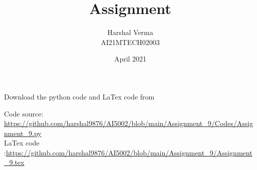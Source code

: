 \documentclass[journal,12pt,twocolumn]{IEEEtran}
\DeclareMathOperator*{\Res}{Res}
\begin{document}
\newcommand{\BEQA}{\begin{eqnarray}}
\newcommand{\EEQA}{\end{eqnarray}}
\newcommand{\define}{\stackrel{\triangle}{=}}

\raggedbottom
\setlength{\parindent}{0pt}
\providecommand{\mbf}{\mathbf}
\providecommand{\pr}[1]{\ensuremath{\Pr\left(#1\right)}}
\providecommand{\qfunc}[1]{\ensuremath{Q\left(#1\right)}}
\providecommand{\fn}[1]{\ensuremath{f\left(#1\right)}}
\providecommand{\e}[1]{\ensuremath{E\left(#1\right)}}
\providecommand{\sbrak}[1]{\ensuremath{{}\left[#1\right]}}
\providecommand{\lsbrak}[1]{\ensuremath{{}\left[#1\right.}}
\providecommand{\rsbrak}[1]{\ensuremath{{}\left.#1\right]}}
\providecommand{\brak}[1]{\ensuremath{\left(#1\right)}}
\providecommand{\lbrak}[1]{\ensuremath{\left(#1\right.}}
\providecommand{\rbrak}[1]{\ensuremath{\left.#1\right)}}
\providecommand{\cbrak}[1]{\ensuremath{\left\{#1\right\}}}
\providecommand{\lcbrak}[1]{\ensuremath{\left\{#1\right.}}
\providecommand{\rcbrak}[1]{\ensuremath{\left.#1\right\}}}
\theoremstyle{remark}
\newtheorem{rem}{Remark}
\newcommand{\sgn}{\mathop{\mathrm{sgn}}}
\providecommand{\abs}[1]{\vert#1\vert}
\providecommand{\res}[1]{\Res\displaylimits_{#1}} 
\providecommand{\norm}[1]{\lVert#1\rVert}
\providecommand{\mtx}[1]{\mathbf{#1}}
\providecommand{\mean}[1]{E[ #1 ]}
\providecommand{\fourier}{\overset{\mathcal{F}}{ \rightleftharpoons}}
\providecommand{\system}{\overset{\mathcal{H}}{ \longleftrightarrow}}
\newcommand{\solution}{\noindent \textbf{Solution: }}
\newcommand{\cosec}{\,\text{cosec}\,}
\providecommand{\dec}[2]{\ensuremath{\overset{#1}{\underset{#2}{\gtrless}}}}
\newcommand{\myvec}[1]{\ensuremath{\begin{pmatrix}#1\end{pmatrix}}}
\newcommand{\mydet}[1]{\ensuremath{\begin{vmatrix}#1\end{vmatrix}}}
\makeatletter
{}
\title{Assignment  }
\author{Harshal Verma\\
AI21MTECH02003}
\date{April 2021}
\maketitle
Download the python code and LaTex code from
\begin{tcolorbox}
Code source: \url{https://github.com/harshal9876/AI5002/blob/main/Assignment_9/Codes/Assignment_9.py} \\
LaTex code :\url{https://github.com/harshal9876/AI5002/blob/main/Assignment_9/Assignment_9.tex}
\end{tcolorbox}
\end{document}
